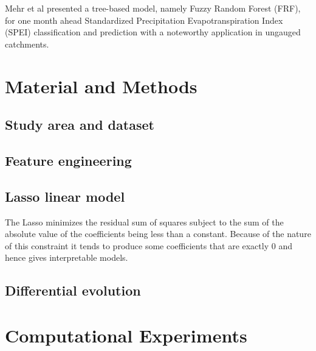 \documentclass[smallextended]{svjour3}       %
\begin{document}
Mehr et al \cite{danandehmehr2020neurofuzzy} presented a tree-based model, namely
Fuzzy Random Forest (FRF), for one month ahead Standardized
Precipitation Evapotranspiration Index (SPEI) classification and
prediction with a noteworthy application in ungauged catchments.


\section{Material and Methods}\label{sec:prob_formulation}

\subsection{Study area and dataset}

\subsection{Feature engineering}

\subsection{Lasso linear model}

The Lasso \cite{tibshirani1996lasso} minimizes the residual sum of squares subject to the sum of the absolute value of the coefficients being less than a constant. Because of the nature of this constraint it tends to produce some coefficients that are exactly 0 and hence gives interpretable models. 

\subsection{Differential evolution}


\section{Computational Experiments}\label{sec:results}
\end{document}
